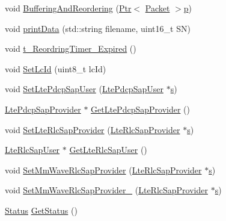 \begin{DoxyCompactItemize}
\item 
void \hyperlink{classns3_1_1McUePdcp_af427000ceed62252a0cce301d47f2e68}{Buffering\+And\+Reordering} (\hyperlink{classns3_1_1Ptr}{Ptr}$<$ \hyperlink{classns3_1_1Packet}{Packet} $>$\hyperlink{lte__link__budget__x2__handover__measures_8m_ac9de518908a968428863f829398a4e62}{p})
\item 
void \hyperlink{classns3_1_1McUePdcp_af1620090ce7552e184098488475d5ff4}{print\+Data} (std\+::string filename, uint16\+\_\+t SN)
\item 
void \hyperlink{classns3_1_1McUePdcp_a9a65382b4dba3e92f958eda6030cedeb}{t\+\_\+\+Reordring\+Timer\+\_\+\+Expired} ()
\item 
void \hyperlink{classns3_1_1McUePdcp_af8cfab0821b897e20865dc3e4a98f0c6}{Set\+Lc\+Id} (uint8\+\_\+t lc\+Id)
\item 
void \hyperlink{classns3_1_1McUePdcp_a5a18f8ac631b3251cfe60d3867ea84b4}{Set\+Lte\+Pdcp\+Sap\+User} (\hyperlink{classns3_1_1LtePdcpSapUser}{Lte\+Pdcp\+Sap\+User} $\ast$\hyperlink{generate__test__data__lte__sinr_8m_ad83eeb3a142285d1243a08c6b7026df8}{s})
\item 
\hyperlink{classns3_1_1LtePdcpSapProvider}{Lte\+Pdcp\+Sap\+Provider} $\ast$ \hyperlink{classns3_1_1McUePdcp_a7744b026f4676ba37a74cd7a33723840}{Get\+Lte\+Pdcp\+Sap\+Provider} ()
\item 
void \hyperlink{classns3_1_1McUePdcp_a6526707dacd489b82deffa9aecde8e8f}{Set\+Lte\+Rlc\+Sap\+Provider} (\hyperlink{classns3_1_1LteRlcSapProvider}{Lte\+Rlc\+Sap\+Provider} $\ast$\hyperlink{generate__test__data__lte__sinr_8m_ad83eeb3a142285d1243a08c6b7026df8}{s})
\item 
\hyperlink{classns3_1_1LteRlcSapUser}{Lte\+Rlc\+Sap\+User} $\ast$ \hyperlink{classns3_1_1McUePdcp_a309f5ad1739516baaf4b295ede0e9e0f}{Get\+Lte\+Rlc\+Sap\+User} ()
\item 
void \hyperlink{classns3_1_1McUePdcp_a2032aa0cb401b36e280e8db583a1cb3e}{Set\+Mm\+Wave\+Rlc\+Sap\+Provider} (\hyperlink{classns3_1_1LteRlcSapProvider}{Lte\+Rlc\+Sap\+Provider} $\ast$\hyperlink{generate__test__data__lte__sinr_8m_ad83eeb3a142285d1243a08c6b7026df8}{s})
\item 
void \hyperlink{classns3_1_1McUePdcp_adde40a45e06b72a2b3f685147b42e2ad}{Set\+Mm\+Wave\+Rlc\+Sap\+Provider\+\_} (\hyperlink{classns3_1_1LteRlcSapProvider}{Lte\+Rlc\+Sap\+Provider} $\ast$\hyperlink{generate__test__data__lte__sinr_8m_ad83eeb3a142285d1243a08c6b7026df8}{s})
\item 
\hyperlink{structns3_1_1McUePdcp_1_1Status}{Status} \hyperlink{classns3_1_1McUePdcp_a0e8b51071ae1a30dfa89997d3c84f8d2}{Get\+Status} ()

\end{DoxyCompactItemize}
